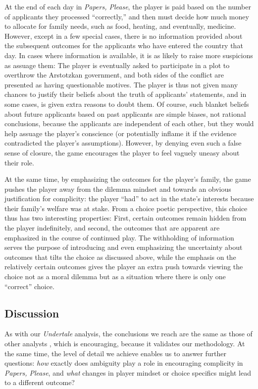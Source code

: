 \documentclass[arts,article,submit,moreauthors,pdftex,10pt,a4paper]{Definitions/mdpi}
\begin{document}
At the end of each day in \emph{Papers, Please}, the player is paid based on the number of applicants they processed ``correctly,'' and then must decide how much money to allocate for family needs, such as food, heating, and eventually, medicine.
%
However, except in a few special cases, there is no information provided about the subsequent outcomes for the applicants who have entered the country that day.
%
In cases where information is available, it is as likely to raise more suspicions as assuage them: The player is eventually asked to participate in a plot to overthrow the Arstotzkan government, and both sides of the conflict are presented as having questionable motives.
%
The player is thus not given many chances to justify their beliefs about the truth of applicants' statements, and in some cases, is given extra reasons to doubt them.
%
Of course, such blanket beliefs about future applicants based on past applicants are simple biases, not rational conclusions, because the applicants are independent of each other, but they would help assuage the player's conscience (or potentially inflame it if the evidence contradicted the player's assumptions).
%
However, by denying even such a false sense of closure, the game encourages the player to feel vaguely uneasy about their role.



At the same time, by emphasizing the outcomes for the player's family, the game pushes the player away from the dilemma mindset and towards an obvious justification for complicity: the player ``had'' to act in the state's interests because their family's welfare was at stake.
%
From a choice poetic perspective, this choice thus has two interesting properties: First, certain outcomes remain hidden from the player indefinitely, and second, the outcomes that are apparent are emphasized in the course of continued play.
%
The withholding of information serves the purpose of introducing and even emphasizing the uncertainty about outcomes that tilts the choice as discussed above, while the emphasis on the relatively certain outcomes gives the player an extra push towards viewing the choice not as a moral dilemma but as a situation where there is only one ``correct'' choice.

\subsection{Discussion}

As with our \emph{Undertale} analysis, the conclusions we reach are the same as those of other analysts \citep{alexander2013designing,formosa2016papers}, which is encouraging, because it validates our methodology.
%
At the same time, the level of detail we achieve enables us to answer further questions: \emph{how} exactly does ambiguity play a role in encouraging complicity in \emph{Papers, Please}, and \emph{what} changes in player mindset or choice specifics might lead to a different outcome?
\end{document}
